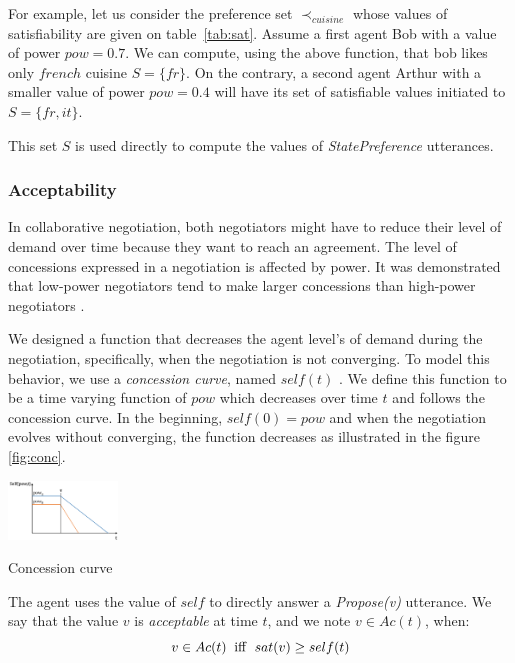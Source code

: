 \documentclass[conference, letterpaper]{IEEEtran}
\begin{document}
	For example, let us consider the preference set $\prec_{cuisine}$ whose values of satisfiability are given on table~\ref{tab:sat}. Assume a first agent Bob with a value of power $pow = 0.7$. We can compute, using the above function, that bob likes only $french$ cuisine $S= \{fr\}$. On the contrary, a second agent Arthur with a smaller value of power $pow=0.4$ will have its set of satisfiable values initiated to $S= \{fr, it\}$. 
	
    This set $S$ is used directly to compute the values of \emph{StatePreference} utterances.
	
	\subsubsection{Acceptability}
	\label{sec:acc}
	In collaborative negotiation, both negotiators might have to reduce their level of demand over time because they want to reach an agreement. The level of concessions expressed in a negotiation is affected by power. It was demonstrated that low-power negotiators tend to make larger concessions than high-power negotiators \cite{de1995impact}.
	
	We designed a function that decreases the agent level's of demand during the negotiation, specifically, when the negotiation is not converging.  To model this behavior, we use a \emph{concession curve}, named $self(t)$ . %
	We define this function to be a time varying function of $pow$ which decreases over time $t$ and follows the concession curve. In the beginning, $self(0) = pow$ and when the negotiation evolves without converging, the function decreases as illustrated in the figure \ref{fig:conc}.
	
	
	\begin{floatingfigure}[l]{1.15in}
		\captionsetup{justification=centering}
		\includegraphics[width=1.15in]{figs/sv3.png}
		\caption{\label{fig:conc}Concession curve}
	\end{floatingfigure} 
	
	
	The agent uses the value of $self$ to directly answer a \emph{Propose(v)} utterance. We say that the value $v$ is \emph{acceptable} at time $t$, and we note $v \in Ac(t)$, when:
	\begin{equation}
	v\in Ac(t)\hspace{2mm}\mathrm{iff}\hspace{2mm}sat(v) \geq self(t)
	\end{equation}
	
\end{document}
